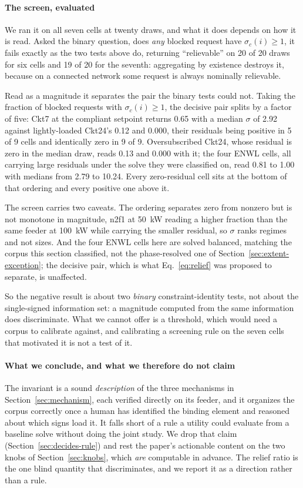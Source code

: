 \documentclass[review,authoryear,12pt]{elsarticle}
\begin{document}
\paragraph{The screen, evaluated}
We ran it on all seven cells at twenty draws, and what it does depends on how
it is read. Asked the binary question, does \emph{any} blocked request have
$\sigma_c(i) \ge 1$, it fails exactly as the two tests above do, returning
``relievable'' on 20 of 20 draws for six cells and 19 of 20 for the seventh:
aggregating by existence destroys it, because on a connected network some
request is always nominally relievable.

Read as a magnitude it separates the pair the binary tests could not. Taking
the fraction of blocked requests with $\sigma_c(i) \ge 1$, the decisive pair
splits by a factor of five: Ckt7 at the compliant setpoint returns 0.65 with a
median $\sigma$ of 2.92 against lightly-loaded Ckt24's 0.12 and 0.000, their
residuals being positive in 5 of 9 cells and identically zero in 9 of 9.
Oversubscribed Ckt24, whose residual is zero in the median draw, reads 0.13 and
0.000 with it; the four ENWL cells, all carrying large residuals under the
solve they were classified on, read 0.81 to 1.00 with medians from 2.79 to
10.24. Every zero-residual cell sits at the bottom of that ordering and every
positive one above it.

The screen carries two caveats. The ordering separates zero from nonzero but is
not monotone in
magnitude, n2f1 at 50~kW reading a higher fraction than the same feeder at
100~kW while carrying the smaller residual, so $\sigma$ ranks regimes and not
sizes. And the four ENWL cells here are solved balanced, matching the corpus
this section classified, not the phase-resolved one of
Section~\ref{sec:extent-exception}; the decisive pair, which is what
Eq.~\eqref{eq:relief} was proposed to separate, is unaffected.

So the negative result is about two \emph{binary} constraint-identity tests,
not about the single-signed information set: a magnitude computed from the same
information does discriminate. What we cannot offer is a threshold, which would
need a corpus to calibrate against, and calibrating a screening rule on the
seven cells that motivated it is not a test of it.

\paragraph{What we conclude, and what we therefore do not claim}
The invariant is a sound \emph{description} of the three mechanisms in
Section~\ref{sec:mechanism}, each verified directly on its feeder, and it
organizes the corpus correctly once a human has identified the binding element
and reasoned about which signs load it. It falls short of a rule a utility
could evaluate from a baseline solve without doing the joint study. We drop
that claim (Section~\ref{sec:decides-rule}) and rest the paper's actionable
content on the two knobs of Section~\ref{sec:knobs}, which \emph{are}
computable in advance. The relief ratio is the one blind quantity that
discriminates, and we report it as a direction rather than a rule.
\end{document}
